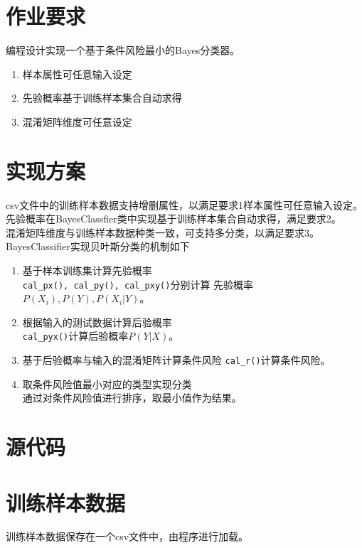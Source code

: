 \documentclass{article}
\begin{document}

\section[作业]{作业要求}
编程设计实现一个基于条件风险最小的Bayes分类器。
\begin{enumerate}
    \item 样本属性可任意输入设定
    \item 先验概率基于训练样本集合自动求得
    \item 混淆矩阵维度可任意设定
\end{enumerate}

\section{实现方案}
\noindent 
csv文件中的训练样本数据支持增删属性，以满足要求1样本属性可任意输入设定。\\
先验概率在BayesClassfier类中实现基于训练样本集合自动求得，满足要求2。\\
混淆矩阵维度与训练样本数据种类一致，可支持多分类，以满足要求3。\\

\noindent
BayesClassifier实现贝叶斯分类的机制如下
\begin{enumerate}
    \item 基于样本训练集计算先验概率 \\
    \verb|cal_px(), cal_py(), cal_pxy()|分别计算
    先验概率$P(X_i),P(Y), P(X_i|Y)$。
    \item 根据输入的测试数据计算后验概率 \\
    \verb|cal_pyx()|计算后验概率$P(Y|X)$。
    \item 基于后验概率与输入的混淆矩阵计算条件风险
    \verb|cal_r()|计算条件风险。
    \item 取条件风险值最小对应的类型实现分类 \\
    通过对条件风险值进行排序，取最小值作为结果。
\end{enumerate}

\section{源代码}


\section{训练样本数据}

训练样本数据保存在一个csv文件中，由程序进行加载。
\end{document}
